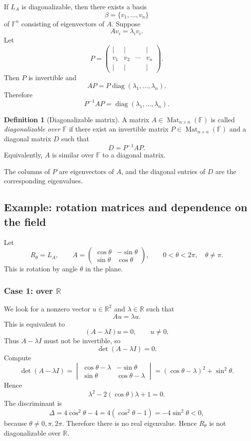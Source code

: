 \documentclass[11pt]{article}
\newcommand{\F}{\mathbb F}
\newcommand{\R}{\mathbb R}
\newcommand{\Mat}{\operatorname{Mat}}
\newcommand{\diag}{\operatorname{diag}}
\theoremstyle{definition}
\newtheorem{definition}{Definition}[section]
\theoremstyle{plain}
\begin{document}
If $L_A$ is diagonalizable, then there exists a basis
\[
\beta=\{v_1,\dots,v_n\}
\]
of $\F^n$ consisting of eigenvectors of $A$.  Suppose
\[
Av_i=\lambda_i v_i.
\]
Let
\[
P=\begin{pmatrix} |&|&&|\\ v_1&v_2&\cdots&v_n\\ |&|&&|\end{pmatrix}.
\]
Then $P$ is invertible and
\[
AP=P\diag(\lambda_1,\dots,\lambda_n).
\]
Therefore
\[
P^{-1}AP=\diag(\lambda_1,\dots,\lambda_n).
\]

\begin{definition}[Diagonalizable matrix]
A matrix $A\in\Mat_{n\times n}(\F)$ is called \emph{diagonalizable over $\F$} if there exist an invertible matrix $P\in\Mat_{n\times n}(\F)$ and a diagonal matrix $D$ such that
\[
D=P^{-1}AP.
\]
Equivalently, $A$ is similar over $\F$ to a diagonal matrix.
\end{definition}

The columns of $P$ are eigenvectors of $A$, and the diagonal entries of $D$ are the corresponding eigenvalues.

\subsection{Example: rotation matrices and dependence on the field}

Let
\[
R_\theta=L_A,
\qquad
A=\begin{pmatrix}
\cos\theta&-\sin\theta\\
\sin\theta&\cos\theta
\end{pmatrix},
\qquad
0<\theta<2\pi,
\quad
\theta\neq\pi.
\]
This is rotation by angle $\theta$ in the plane.

\subsubsection*{Case 1: over \texorpdfstring{$\R$}{R}}

We look for a nonzero vector $u\in\R^2$ and $\lambda\in\R$ such that
\[
Au=\lambda u.
\]
This is equivalent to
\[
(A-\lambda I)u=0,
\qquad u\neq 0.
\]
Thus $A-\lambda I$ must not be invertible, so
\[
\det(A-\lambda I)=0.
\]
Compute
\[
\det(A-\lambda I)
=\begin{vmatrix}
\cos\theta-\lambda&-\sin\theta\\
\sin\theta&\cos\theta-\lambda
\end{vmatrix}
=(\cos\theta-\lambda)^2+\sin^2\theta.
\]
Hence
\[
\lambda^2-2(\cos\theta)\lambda+1=0.
\]
The discriminant is
\[
\Delta=4\cos^2\theta-4=4(\cos^2\theta-1)=-4\sin^2\theta<0,
\]
because $\theta\neq 0,\pi,2\pi$.  Therefore there is no real eigenvalue.  Hence $R_\theta$ is not diagonalizable over $\R$.
\end{document}
